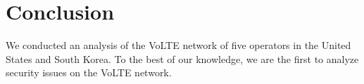 \chapter{Conclusion}
\label{sec:concl}

We conducted an analysis of the VoLTE network of five operators in the United States and South Korea.
To the best of our knowledge, we are the first to analyze security issues on the VoLTE network.
